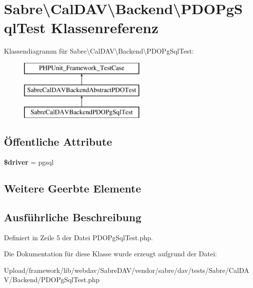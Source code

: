 \hypertarget{class_sabre_1_1_cal_d_a_v_1_1_backend_1_1_p_d_o_pg_sql_test}{}\section{Sabre\textbackslash{}Cal\+D\+AV\textbackslash{}Backend\textbackslash{}P\+D\+O\+Pg\+Sql\+Test Klassenreferenz}
\label{class_sabre_1_1_cal_d_a_v_1_1_backend_1_1_p_d_o_pg_sql_test}
Klassendiagramm für Sabre\textbackslash{}Cal\+D\+AV\textbackslash{}Backend\textbackslash{}P\+D\+O\+Pg\+Sql\+Test\+:\begin{figure}[H]
\begin{center}
\leavevmode
\includegraphics[height=3.000000cm]{class_sabre_1_1_cal_d_a_v_1_1_backend_1_1_p_d_o_pg_sql_test}
\end{center}
\end{figure}
\subsection*{Öffentliche Attribute}
\begin{DoxyCompactItemize}
\item 
\mbox{\label{class_sabre_1_1_cal_d_a_v_1_1_backend_1_1_p_d_o_pg_sql_test_a4e831e8d74b7f660addacb9e6f3dfcd0}} 
{\bfseries \$driver} = \textquotesingle{}pgsql\textquotesingle{}
\end{DoxyCompactItemize}
\subsection*{Weitere Geerbte Elemente}


\subsection{Ausführliche Beschreibung}


Definiert in Zeile 5 der Datei P\+D\+O\+Pg\+Sql\+Test.\+php.



Die Dokumentation für diese Klasse wurde erzeugt aufgrund der Datei\+:\begin{DoxyCompactItemize}
\item 
Upload/framework/lib/webdav/\+Sabre\+D\+A\+V/vendor/sabre/dav/tests/\+Sabre/\+Cal\+D\+A\+V/\+Backend/P\+D\+O\+Pg\+Sql\+Test.\+php\end{DoxyCompactItemize}
